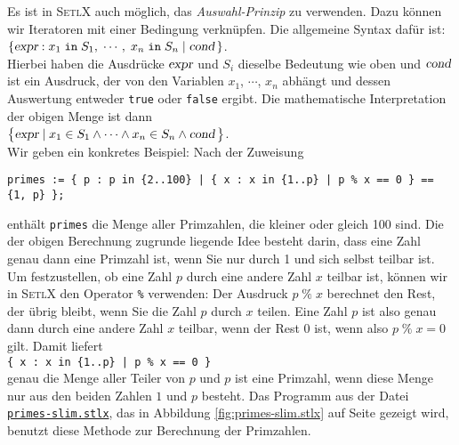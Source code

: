 Es ist in \textsc{SetlX} auch m\"{o}glich, das \emph{Auswahl-Prinzip} zu verwenden.  Dazu
k\"{o}nnen wir Iteratoren mit einer Bedingung verkn\"{u}pfen.   Die allgemeine Syntax
daf\"{u}r ist: \\[0.2cm]
\hspace*{1.3cm}  
$\{ \textsl{expr} : x_1 \;\mathtt{in}\; S_1,\; \cdots,\; x_n \;\mathtt{in}\; S_n \mid \textsl{cond}\, \}$. 
\\[0.2cm]
Hierbei haben die Ausdr\"{u}cke  $\textsl{expr}$ und $S_i$ dieselbe
Bedeutung wie oben und 
 $\textsl{cond}$ ist ein Ausdruck, der von den Variablen $x_1$, $\cdots$, $x_n$ abh\"{a}ngt und dessen Auswertung
entweder \texttt{true} oder \texttt{false} ergibt.  Die mathematische
Interpretation der obigen Menge ist dann \\[0.2cm]
\hspace*{1.3cm} 
$\bigl\{ \textsl{expr} \mid x_1 \in S_1 \wedge \cdots \wedge x_n \in S_n \wedge \textsl{cond} \,\bigr\}$. 
\\[0.2cm]
Wir geben ein konkretes Beispiel: Nach der Zuweisung
\begin{alltt}
  \texttt{primes := \{ p : p in  \{2..100\} | \{ x : x in \{1..p\} | p \% x == 0 \} == \{1, p\} \};}
\end{alltt}
 enth\"{a}lt \texttt{primes} die Menge aller Primzahlen, die
kleiner oder gleich 100 sind.  Die der obigen Berechnung zugrunde liegende Idee
besteht darin, dass eine Zahl genau dann eine Primzahl ist, wenn Sie nur durch 1
und sich selbst teilbar ist.  Um festzustellen, ob eine Zahl $p$ durch eine
andere Zahl $x$ teilbar ist, k\"{o}nnen wir in \textsc{SetlX} den Operator
\texttt{\%} verwenden: Der Ausdruck $p \;\texttt{\%}\; x$ berechnet den Rest,
der \"{u}brig bleibt, wenn Sie die Zahl $p$ durch $x$ teilen.  
Eine Zahl $p$ ist also genau dann durch eine andere Zahl $x$ teilbar, wenn der
Rest $0$ ist, wenn also  $p \;\texttt{\%}\; x = 0$
gilt.  Damit liefert \\[0.2cm]
\hspace*{1.3cm} \texttt{\{ x : x in \{1..p\} | p \% x == 0 \}}
\\[0.2cm]
genau die Menge aller Teiler von $p$ und $p$ ist eine Primzahl, wenn diese Menge
nur aus den beiden Zahlen $1$ und $p$ besteht.  Das Programm aus der Datei 
\href{https://github.com/karlstroetmann/Logik/blob/master/SetlX/primes-slim.stlx}{\texttt{primes-slim.stlx}}, 
das in Abbildung
\ref{fig:primes-slim.stlx} auf Seite \pageref{fig:primes-slim.stlx} gezeigt wird, benutzt diese Methode
zur Berechnung der Primzahlen.

